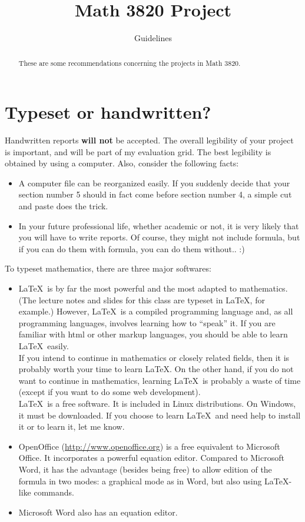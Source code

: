\documentclass[12pt]{article}
\title{Math 3820 Project}
\author{Guidelines}
\date{}
\begin{document}
\maketitle

\begin{abstract}
These are some recommendations concerning the projects in Math 3820.
\end{abstract}

\section{Typeset or handwritten?}
Handwritten reports \textbf{will not} be accepted. The overall legibility of your project is important, and will be part of my evaluation grid. The best legibility is obtained by using a computer. Also, consider the following facts:
\begin{itemize}
\item A computer file can be reorganized easily. If you suddenly decide that your section number 5 should in fact come before section number 4, a simple cut and paste does the trick.
\item In your future professional life, whether academic or not, it is very likely that you will have to write reports. Of course, they might not include formula, but if you can do them with formula, you can do them without.. :)
\end{itemize}
To typeset mathematics, there are three major softwares:
\begin{itemize}
\item \LaTeX\ is by far the most powerful and the most adapted to mathematics. (The lecture notes and slides for this class are typeset in \LaTeX, for example.) However, \LaTeX\ is a compiled programming language and, as all programming languages, involves learning how to ``speak'' it. If you are familiar with html or other markup languages, you should be able to learn \LaTeX\ easily.\\
If you intend to continue in mathematics or closely related fields, then it is probably worth your time to learn \LaTeX. On the other hand, if you do not want to continue in mathematics, learning \LaTeX\ is probably a waste of time (except if you want to do some web development).\\
\LaTeX\ is a free software. It is included in Linux distributions. On Windows, it must be downloaded. If you choose to learn \LaTeX\ and need help to install it or to learn it, let me know.
\item OpenOffice (\url{http://www.openoffice.org}) is a free equivalent to Microsoft Office. It incorporates a powerful equation editor. Compared to Microsoft Word, it has the advantage (besides being free) to allow edition of the formula in two modes: a graphical mode as in Word, but also using \LaTeX-like commands.
\item Microsoft Word also has an equation editor.
\end{itemize}
\end{document}
